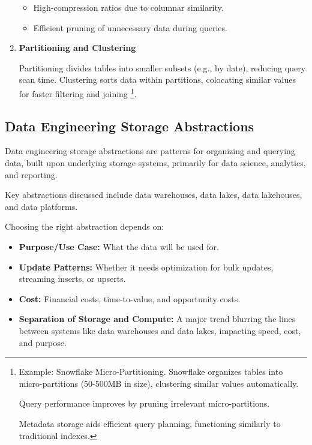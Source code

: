 \begin{enumerate}
\begin{itemize}
        \item High-compression ratios due to columnar similarity.
        
        \item Efficient pruning of unnecessary data during queries.
    \end{itemize}


    \item \textbf{Partitioning and Clustering}
    
    \noindent
    Partitioning divides tables into smaller subsets (e.g., by date),
    reducing query scan time. Clustering sorts data within partitions,
    colocating similar values for faster filtering and joining
    \footnote{
        Example: Snowflake Micro-Partitioning.
        Snowflake organizes tables into micro-partitions (50-500MB in size),
        clustering similar values automatically.

        Query performance improves by pruning irrelevant micro-partitions.

        Metadata storage aids efficient query planning, functioning similarly to traditional indexes.
    }.

\end{enumerate}







\subsection{Data Engineering Storage Abstractions}
Data engineering storage abstractions are patterns for organizing
and querying data, built upon underlying storage systems, primarily
for data science, analytics, and reporting.

Key abstractions discussed include data warehouses, data lakes,
data lakehouses, and data platforms.

Choosing the right abstraction depends on:
\begin{itemize}
    \item \textbf{Purpose/Use Case:} What the data will be used for.
    \item \textbf{Update Patterns:} Whether it needs optimization
    for bulk updates, streaming inserts, or upserts.
    \item \textbf{Cost:} Financial costs, time-to-value, and
    opportunity costs.
    \item \textbf{Separation of Storage and Compute:} A major trend
    blurring the lines between systems like data warehouses and data
    lakes, impacting speed, cost, and purpose.
\end{itemize}


